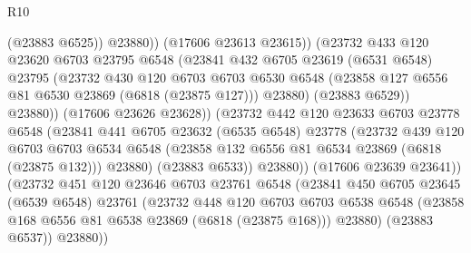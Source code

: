 \begin{lexlean}{R10}
\begin{coremodule}
{{{{{{{{{{{{{{{{{{{{{{{{{{{{{{{{{{{{{{{{{{{{{{{{{{{{{{{{{{{{{{{{{{{{{{{{{{{{{{{{{{{{                                (@23883 @6525))
                              @23880))
                          (@17606 @23613 @23615))
                        (@23732
                          @433
                          @120
                          @23620
                          @6703
                          @23795
                          @6548
                          (@23841
                            @432
                            @6705
                            @23619
                            (@6531 @6548)
                            @23795
                            (@23732
                              @430
                              @120
                              @6703
                              @6703
                              @6530
                              @6548
                              (@23858 @127 @6556 @81 @6530 @23869 (@6818 (@23875 @127)))
                              @23880)
                            (@23883 @6529))
                          @23880))
                      (@17606 @23626 @23628))
                    (@23732
                      @442
                      @120
                      @23633
                      @6703
                      @23778
                      @6548
                      (@23841
                        @441
                        @6705
                        @23632
                        (@6535 @6548)
                        @23778
                        (@23732
                          @439
                          @120
                          @6703
                          @6703
                          @6534
                          @6548
                          (@23858 @132 @6556 @81 @6534 @23869 (@6818 (@23875 @132)))
                          @23880)
                        (@23883 @6533))
                      @23880))
                  (@17606 @23639 @23641))
                (@23732
                  @451
                  @120
                  @23646
                  @6703
                  @23761
                  @6548
                  (@23841
                    @450
                    @6705
                    @23645
                    (@6539 @6548)
                    @23761
                    (@23732
                      @448
                      @120
                      @6703
                      @6703
                      @6538
                      @6548
                      (@23858 @168 @6556 @81 @6538 @23869 (@6818 (@23875 @168)))
                      @23880)
                    (@23883 @6537))
                  @23880))
}}}}}}}}}}}}}}}}}}}}}}}}}}}}}}}}}}}}}}}}}}}}}}}}}}}}}}}}}}}}}}}}}}}}}}}}}}}}}}}}}}}}
\end{coremodule}
\end{lexlean}
